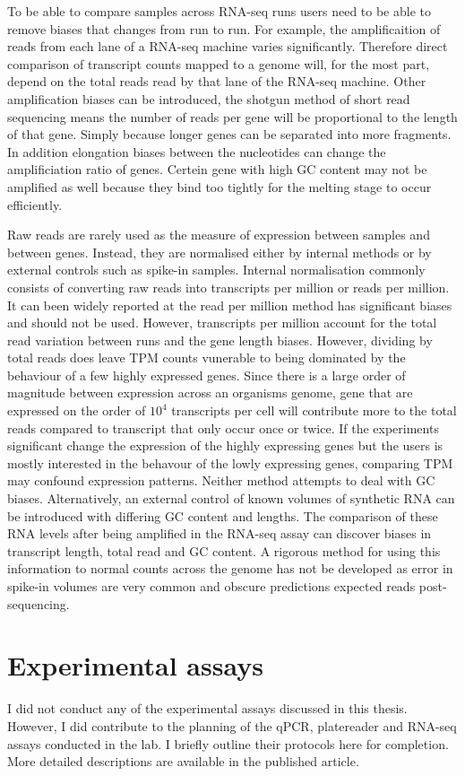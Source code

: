 \documentclass{SBCbookchapter}
\begin{document}
To be able to compare samples across RNA-seq runs users need to be able to remove biases that changes from run to run. For example, the amplificaition of reads from each lane of a RNA-seq machine varies significantly. Therefore direct comparison of transcript counts mapped to a genome will, for the most part, depend on the total reads read by that lane of the RNA-seq machine.  Other amplification biases can be introduced, the shotgun method of short read sequencing means the number of reads per gene will be proportional to the length of that gene. Simply because longer genes can be separated into more fragments. In addition elongation biases between the nucleotides can change the amplificiation ratio of genes. Certein gene with high GC content may not be amplified as well because they bind too tightly for the melting stage to occur efficiently. 

Raw reads are rarely used as the measure of expression between samples and between genes. Instead, they are normalised either by internal methods or by external controls such as spike-in samples. Internal normalisation commonly consists of converting raw reads into transcripts per million or reads per million. It can been widely reported at the read per million method has significant biases and should not be used. However, transcripts per million account for the total read variation between runs and the gene length biases. However, dividing by total reads does leave TPM counts vunerable to being dominated by the behaviour of a few highly expressed genes. Since there is a large order of magnitude between expression across an organisms genome, gene that are expressed on the order of $10^4$ transcripts per cell will contribute more to the total reads compared to transcript that only occur once or twice. If the experiments significant change the expression of the highly expressing genes but the users is mostly interested in the behavour of the lowly expressing genes, comparing TPM may confound expression patterns. Neither method attempts to deal with GC biases. Alternatively, an external control of known volumes of synthetic RNA can be introduced with differing GC content and lengths. The comparison of these RNA levels after being amplified in the RNA-seq assay can discover biases in transcript length, total read and GC content. A rigorous method for using this information to normal counts across the genome has not be developed as error in spike-in volumes are very common and obscure predictions expected reads post-sequencing.

\section{Experimental assays}
I did not conduct any of the experimental assays discussed in this thesis. However, I did contribute to the planning of the qPCR, platereader and RNA-seq assays conducted in the lab. I briefly outline their protocols here for completion. More detailed descriptions are available in the published article.



\end{document}
